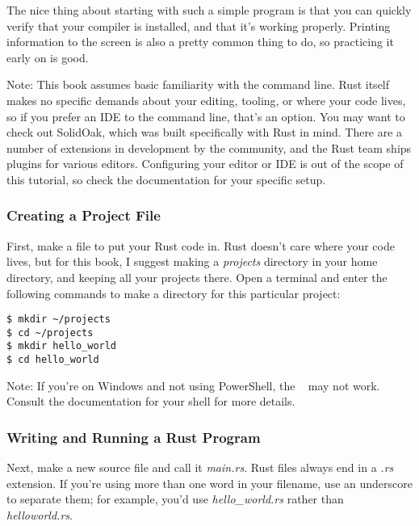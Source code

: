 \blank

The nice thing about starting with such a simple program is that you can quickly verify that your compiler is installed, 
and that it's working properly. Printing information to the screen is also a pretty common thing to do, so practicing it 
early on is good.

\begin{myquote}
    Note: This book assumes basic familiarity with the command line. Rust itself makes no specific demands about your editing,
    tooling, or where your code lives, so if you prefer an IDE to the command line, that's an option. You may want to check out
    SolidOak, which was built specifically with Rust in mind. There are a number of extensions in development by the community, 
    and the Rust team ships plugins for various editors. Configuring your editor or IDE is out of the scope of this tutorial, so
    check the documentation for your specific setup.
\end{myquote}

\subsubsection*{Creating a Project File}

First, make a file to put your Rust code in. Rust doesn't care where your code lives, but for this book, I suggest making a 
\emph{projects} directory in your home directory, and keeping all your projects there. Open a terminal and enter the following 
commands to make a directory for this particular project:

\begin{verbatim}
$ mkdir ~/projects
$ cd ~/projects
$ mkdir hello_world
$ cd hello_world
\end{verbatim}

\begin{myquote}
Note: If you're on Windows and not using PowerShell, the ~ may not work. Consult the documentation for your shell for more details.
\end{myquote}

\subsubsection*{Writing and Running a Rust Program}

Next, make a new source file and call it \emph{main.rs}. Rust files always end in a \emph{.rs} extension. If you're using more 
than one word in your filename, use an underscore to separate them; for example, you'd use \emph{hello\_world.rs} rather than 
\emph{helloworld.rs}.


